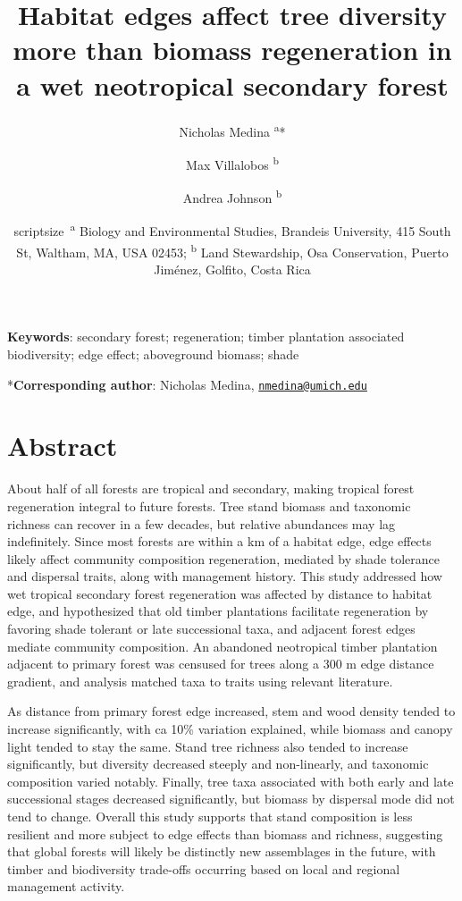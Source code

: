 \documentclass[
  12pt,
]{article}
\title{Habitat edges affect tree diversity more than biomass regeneration in a wet neotropical secondary forest}
\author{Nicholas Medina \textsuperscript{a}* \and Max Villalobos \textsuperscript{b} \and Andrea Johnson \textsuperscript{b}}
\date{scriptsize~\textsuperscript{a} Biology and Environmental Studies, Brandeis University, 415 South St, Waltham, MA, USA 02453; \textsuperscript{b} Land Stewardship, Osa Conservation, Puerto Jiménez, Golfito, Costa Rica}
\begin{document}
\maketitle

\hfill\break
\hfill\break

\textbf{Keywords}: secondary forest; regeneration; timber plantation associated biodiversity; edge effect; aboveground biomass; shade

\hfill\break
\hfill\break

*\textbf{Corresponding author}: Nicholas Medina, \href{mailto:nmedina@umich.edu}{\nolinkurl{nmedina@umich.edu}}

\newpage

\hypertarget{abstract}{%
\section*{Abstract}\label{abstract}}

About half of all forests are tropical and secondary, making tropical forest regeneration integral to future forests.
Tree stand biomass and taxonomic richness can recover in a few decades, but relative abundances may lag indefinitely.
Since most forests are within a km of a habitat edge, edge effects likely affect community composition regeneration, mediated by shade tolerance and dispersal traits, along with management history.
This study addressed how wet tropical secondary forest regeneration was affected by distance to habitat edge, and hypothesized that old timber plantations facilitate regeneration by favoring shade tolerant or late successional taxa, and adjacent forest edges mediate community composition.
An abandoned neotropical timber plantation adjacent to primary forest was censused for trees along a 300 m edge distance gradient, and analysis matched taxa to traits using relevant literature.

As distance from primary forest edge increased, stem and wood density tended to increase significantly, with ca 10\% variation explained, while biomass and canopy light tended to stay the same.
Stand tree richness also tended to increase significantly, but diversity decreased steeply and non-linearly, and taxonomic composition varied notably.
Finally, tree taxa associated with both early and late successional stages decreased significantly, but biomass by dispersal mode did not tend to change.
Overall this study supports that stand composition is less resilient and more subject to edge effects than biomass and richness, suggesting that global forests will likely be distinctly new assemblages in the future, with timber and biodiversity trade-offs occurring based on local and regional management activity.
\end{document}
